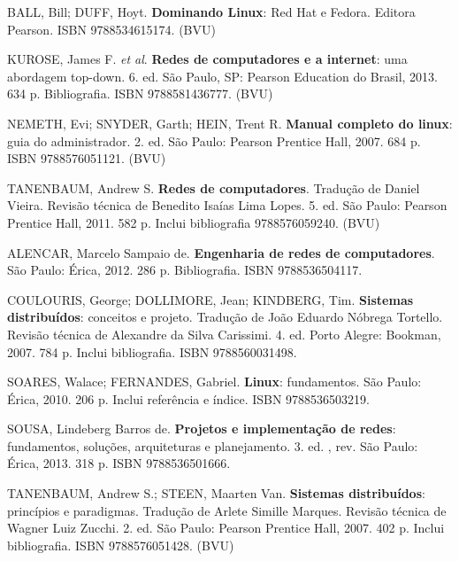 \begin{pud}
		
	\begin{bibbasica}
		\item BALL, Bill; DUFF, Hoyt. \textbf{Dominando Linux}: Red Hat e Fedora. Editora Pearson. ISBN 9788534615174. (BVU)
		\item KUROSE, James F. \textit{et al}. \textbf{Redes de computadores e a internet}: uma abordagem top-down. 6. ed. São Paulo, SP: Pearson Education do Brasil, 2013. 634 p. Bibliografia. ISBN 9788581436777. (BVU)
		\item NEMETH, Evi; SNYDER, Garth; HEIN, Trent R. \textbf{Manual completo do linux}: guia do administrador. 2. ed. São Paulo: Pearson Prentice Hall, 2007. 684 p. ISBN 9788576051121. (BVU)
		
		\item TANENBAUM, Andrew S. \textbf{Redes de computadores}. Tradução de Daniel Vieira. Revisão técnica de Benedito Isaías Lima Lopes. 5. ed. São Paulo: Pearson Prentice Hall, 2011. 582 p. Inclui bibliografia 9788576059240. (BVU) 

		
	\end{bibbasica}
	
	\begin{bibcomplementar}
	
		\item ALENCAR, Marcelo Sampaio de. \textbf{Engenharia de redes de computadores}. São Paulo: Érica, 2012. 286 p. Bibliografia. ISBN 9788536504117.
		\item COULOURIS, George; DOLLIMORE, Jean; KINDBERG, Tim. \textbf{Sistemas distribuídos}: conceitos e projeto. Tradução de João Eduardo Nóbrega Tortello. Revisão técnica de Alexandre da Silva Carissimi. 4. ed. Porto Alegre: Bookman, 2007. 784 p. Inclui bibliografia. ISBN 9788560031498.
		\item SOARES, Walace; FERNANDES, Gabriel. \textbf{Linux}: fundamentos. São Paulo: Érica, 2010. 206 p. Inclui referência e índice. ISBN 9788536503219.
		\item SOUSA, Lindeberg Barros de. \textbf{Projetos e implementação de redes}: fundamentos, soluções, arquiteturas e planejamento. 3. ed. , rev. São Paulo: Érica, 2013. 318 p. ISBN 9788536501666.		
		\item TANENBAUM, Andrew S.; STEEN, Maarten Van. \textbf{Sistemas distribuídos}: princípios e paradigmas. Tradução de Arlete Simille Marques. Revisão técnica de Wagner Luiz Zucchi. 2. ed. São Paulo: Pearson Prentice Hall, 2007. 402 p. Inclui bibliografia. ISBN 9788576051428. (BVU)

	\end{bibcomplementar}

\end{pud}




